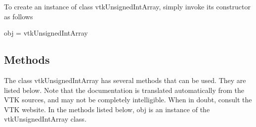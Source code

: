 To create an instance of class vtk\-Unsigned\-Int\-Array, simply invoke its constructor as follows \begin{DoxyVerb}  obj = vtkUnsignedIntArray
\end{DoxyVerb}
 \hypertarget{vtkwidgets_vtkxyplotwidget_Methods}{}\subsection{Methods}\label{vtkwidgets_vtkxyplotwidget_Methods}
The class vtk\-Unsigned\-Int\-Array has several methods that can be used. They are listed below. Note that the documentation is translated automatically from the V\-T\-K sources, and may not be completely intelligible. When in doubt, consult the V\-T\-K website. In the methods listed below, {\ttfamily obj} is an instance of the vtk\-Unsigned\-Int\-Array class. 
